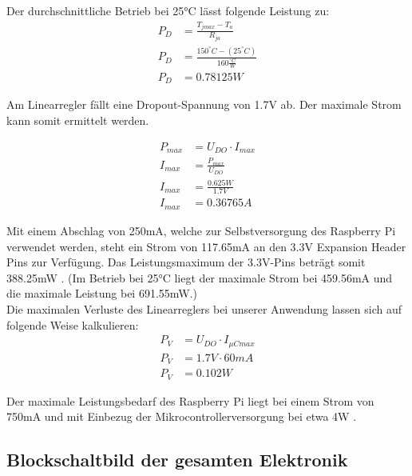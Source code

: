 Der durchschnittliche Betrieb bei 25°C lässt folgende Leistung zu:
\begin{align*}
    P_D &= \frac{T_{jmax} - T_a}{R_{ja}} \\
    P_D &= \frac{150^{\circ}C - (25^{\circ}C)}{160\frac{{}^{\circ}C}{W}} \\
    P_D &= 0.78125W
\end{align*}

Am Linearregler fällt eine Dropout-Spannung von 1.7V ab.
Der maximale Strom kann somit ermittelt werden.

\begin{align*}
    P_{max} &= U_{DO} \cdot I_{max} \\
    I_{max} &= \frac{P_{max}}{U_{DO}} \\
    I_{max} &= \frac{0.625W}{1.7V} \\
    I_{max} &= 0.36765A
\end{align*}

Mit einem Abschlag von 250mA, welche zur Selbstversorgung des Raspberry Pi verwendet werden, steht ein Strom von 117.65mA an den 3.3V Expansion Header Pins zur Verfügung.
Das Leistungsmaximum der 3.3V-Pins beträgt somit 388.25mW .
(Im Betrieb bei 25°C liegt der maximale Strom bei 459.56mA und die maximale Leistung bei 691.55mW.)\\
Die maximalen Verluste des Linearreglers bei unserer Anwendung lassen sich auf folgende Weise kalkulieren:
\begin{align*}
    P_{V} &= U_{DO} \cdot I_{\mu Cmax} \\
    P_{V} &= 1.7V \cdot 60mA \\
    P_{V} &= 0.102W
\end{align*}

Der maximale Leistungsbedarf des Raspberry Pi liegt bei einem Strom von 750mA und mit Einbezug der Mikrocontrollerversorgung bei etwa 4W .

\subsection{Blockschaltbild der gesamten Elektronik}

